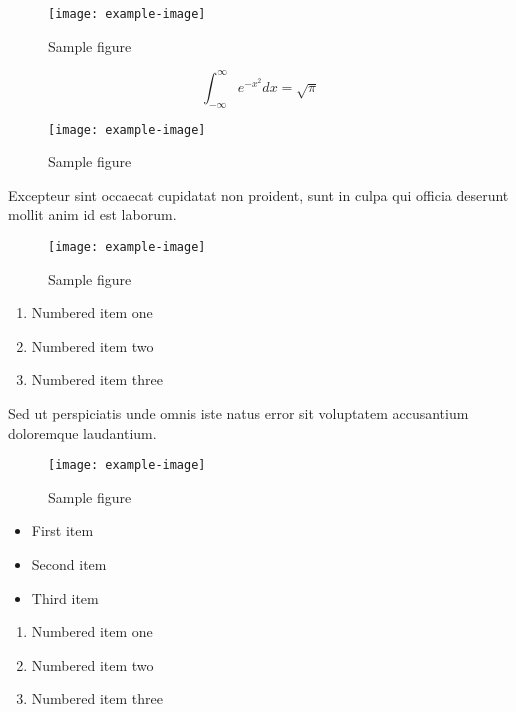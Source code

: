\documentclass{article}
\begin{document}
\begin{figure}[h]
    \centering
    \texttt{[image: example-image]}
    \caption{Sample figure}
    \label{fig:sample}
\end{figure}

\begin{equation}
    \int_{-\infty}^{\infty} e^{-x^2} dx = \sqrt{\pi}
\end{equation}

\begin{figure}[h]
    \centering
    \texttt{[image: example-image]}
    \caption{Sample figure}
    \label{fig:sample}
\end{figure}

Excepteur sint occaecat cupidatat non proident, sunt in culpa qui officia deserunt mollit anim id est laborum.

\begin{figure}[h]
    \centering
    \texttt{[image: example-image]}
    \caption{Sample figure}
    \label{fig:sample}
\end{figure}

\begin{enumerate}
\item Numbered item one
\item Numbered item two
\item Numbered item three
\end{enumerate}


Sed ut perspiciatis unde omnis iste natus error sit voluptatem accusantium doloremque laudantium.

\begin{figure}[h]
    \centering
    \texttt{[image: example-image]}
    \caption{Sample figure}
    \label{fig:sample}
\end{figure}

\begin{itemize}
\item First item
\item Second item
\item Third item
\end{itemize}

\begin{enumerate}
\item Numbered item one
\item Numbered item two
\item Numbered item three
\end{enumerate}
\end{document}
